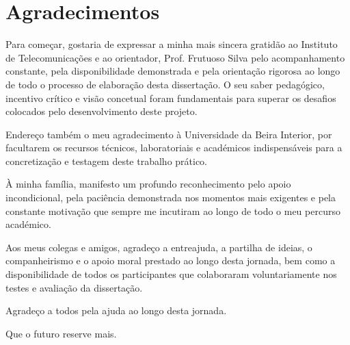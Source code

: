 
\chapter{Agradecimentos}
\label{chap:agr}

Para começar, gostaria de expressar a minha mais sincera gratidão ao Instituto de Telecomunicações e ao orientador, Prof. Frutuoso Silva pelo acompanhamento constante, pela disponibilidade demonstrada e pela orientação rigorosa ao longo de todo o processo de elaboração desta dissertação. O seu saber pedagógico, incentivo crítico e visão concetual foram fundamentais para superar os desafios colocados pelo desenvolvimento deste projeto.

Endereço também o meu agradecimento à Universidade da Beira Interior, por facultarem os recursos técnicos, laboratoriais e académicos indispensáveis para a concretização e testagem deste trabalho prático.

À minha família, manifesto um profundo reconhecimento pelo apoio incondicional, pela paciência demonstrada nos momentos mais exigentes e pela constante motivação que sempre me incutiram ao longo de todo o meu percurso académico.

Aos meus colegas e amigos, agradeço a entreajuda, a partilha de ideias, o companheirismo e o apoio moral prestado ao longo desta jornada, bem como a disponibilidade de todos os participantes que colaboraram voluntariamente nos testes e avaliação da dissertação.

Agradeço a todos pela ajuda ao longo desta jornada. 

Que o futuro reserve mais.


